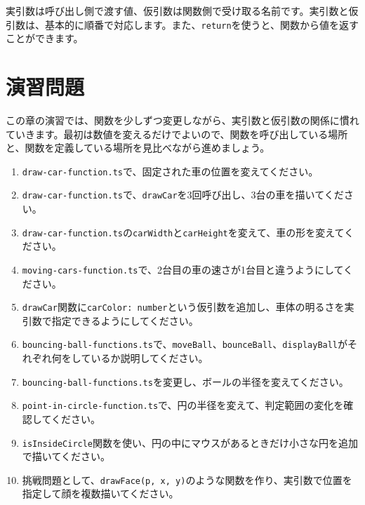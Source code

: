 実引数は呼び出し側で渡す値、仮引数は関数側で受け取る名前です。実引数と仮引数は、基本的に順番で対応します。また、\texttt{return}を使うと、関数から値を返すことができます。

\section{演習問題}

この章の演習では、関数を少しずつ変更しながら、実引数と仮引数の関係に慣れていきます。最初は数値を変えるだけでよいので、関数を呼び出している場所と、関数を定義している場所を見比べながら進めましょう。

\begin{enumerate}
    \item \texttt{draw-car-function.ts}で、固定された車の位置を変えてください。
    \item \texttt{draw-car-function.ts}で、\texttt{drawCar}を3回呼び出し、3台の車を描いてください。
    \item \texttt{draw-car-function.ts}の\texttt{carWidth}と\texttt{carHeight}を変えて、車の形を変えてください。
    \item \texttt{moving-cars-function.ts}で、2台目の車の速さが1台目と違うようにしてください。
    \item \texttt{drawCar}関数に\texttt{carColor: number}という仮引数を追加し、車体の明るさを実引数で指定できるようにしてください。
    \item \texttt{bouncing-ball-functions.ts}で、\texttt{moveBall}、\texttt{bounceBall}、\texttt{displayBall}がそれぞれ何をしているか説明してください。
    \item \texttt{bouncing-ball-functions.ts}を変更し、ボールの半径を変えてください。
    \item \texttt{point-in-circle-function.ts}で、円の半径を変えて、判定範囲の変化を確認してください。
    \item \texttt{isInsideCircle}関数を使い、円の中にマウスがあるときだけ小さな円を追加で描いてください。
    \item 挑戦問題として、\texttt{drawFace(p, x, y)}のような関数を作り、実引数で位置を指定して顔を複数描いてください。
\end{enumerate}
